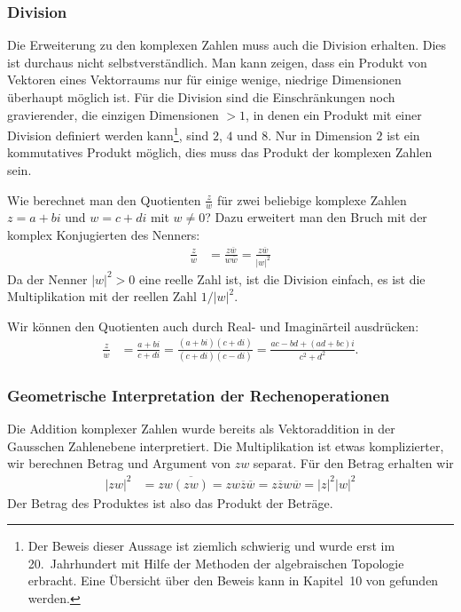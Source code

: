 \subsubsection{Division}
Die Erweiterung zu den komplexen Zahlen muss auch die Division erhalten.
Dies ist durchaus nicht selbstverständlich.
Man kann zeigen, dass ein Produkt von Vektoren eines Vektorraums nur für
einige wenige, niedrige Dimensionen überhaupt möglich ist.
Für die Division sind die Einschränkungen noch gravierender, die einzigen
Dimensionen $>1$, in denen ein Produkt mit einer Division definiert werden
kann\footnote{Der Beweis dieser Aussage ist ziemlich schwierig und wurde
erst im 20.~Jahrhundert mit Hilfe der Methoden der algebraischen Topologie
erbracht. Eine Übersicht über den Beweis kann in Kapitel~10 von
\cite{buch:ebbinghaus} gefunden werden.}, sind $2$, $4$ und $8$.
Nur in Dimension $2$ ist ein kommutatives Produkt möglich, dies muss das
Produkt der komplexen Zahlen sein.

Wie berechnet man den Quotienten $\frac{z}{w}$ für zwei beliebige komplexe
Zahlen $z=a+bi$ und $w=c+di$ mit $w\ne 0$?
Dazu erweitert man den Bruch mit der komplex Konjugierten des Nenners:
\begin{align*}
\frac{z}{w}
&=
\frac{z\overline{w}}{w\overline{w}}
=
\frac{z\overline{w}}{|w|^2}
\end{align*}
Da der Nenner $|w|^2>0$ eine reelle Zahl ist, ist die Division einfach,
es ist die Multiplikation mit der reellen Zahl $1/|w|^2$.

Wir können den Quotienten auch durch Real- und Imaginärteil ausdrücken:
\begin{align*}
\frac{z}{w}
&=
\frac{a+bi}{c+di}
=
\frac{(a+bi)(c+di)}{(c+di)(c-di)}
=
\frac{ac-bd +(ad+bc)i}{c^2+d^2}.
\end{align*}


\subsubsection{Geometrische Interpretation der Rechenoperationen}
Die Addition komplexer Zahlen wurde bereits als Vektoraddition
in der Gausschen Zahlenebene interpretiert. 
Die Multiplikation ist etwas komplizierter, wir berechnen Betrag
und Argument von $zw$ separat.
Für den Betrag erhalten wir
\begin{align*}
|zw|^2
&=
zw\overline{(zw)}
=
zw\overline{z}\overline{w}
=
z\overline{z}w\overline{w}
=
|z|^2|w|^2
\end{align*}
Der Betrag des Produktes ist also das Produkt der Beträge.

